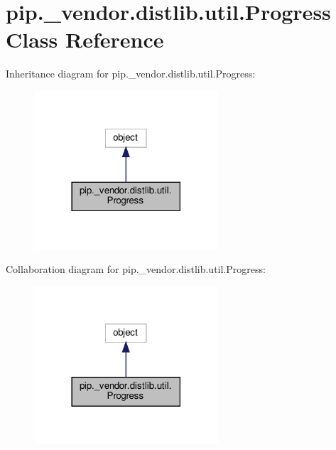 \hypertarget{classpip_1_1__vendor_1_1distlib_1_1util_1_1Progress}{}\section{pip.\+\_\+vendor.\+distlib.\+util.\+Progress Class Reference}
\label{classpip_1_1__vendor_1_1distlib_1_1util_1_1Progress}


Inheritance diagram for pip.\+\_\+vendor.\+distlib.\+util.\+Progress\+:
\nopagebreak
\begin{figure}[H]
\begin{center}
\leavevmode
\includegraphics[width=194pt]{classpip_1_1__vendor_1_1distlib_1_1util_1_1Progress__inherit__graph}
\end{center}
\end{figure}


Collaboration diagram for pip.\+\_\+vendor.\+distlib.\+util.\+Progress\+:
\nopagebreak
\begin{figure}[H]
\begin{center}
\leavevmode
\includegraphics[width=194pt]{classpip_1_1__vendor_1_1distlib_1_1util_1_1Progress__coll__graph}
\end{center}
\end{figure}
